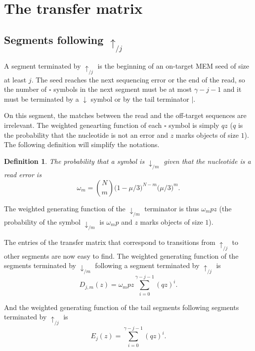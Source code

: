 \documentclass{article}
\newtheorem{definition}{Definition}
\begin{document}
\section{The transfer matrix}
\label{sec:transfer_mat}



\subsection{Segments following $\uparrow_{/j}$}

A segment terminated by $\uparrow_{/j}$ is the beginning of an on-target
MEM seed of size at least $j$. The seed reaches the next sequencing
error or the end of the read, so the number of $\square$ symbols in the
next segment must be at most $\gamma-j-1$ and it must be terminated by a
$\downarrow$ symbol or by the tail terminator $|$.

On this segment, the matches between the read and the off-target sequences
are irrelevant. The weighted genearting function of each $\square$ symbol
is simply $qz$ ($q$ is the probability that the nucleotide is not an error
and $z$ marks objects of size $1$). The following definition will simplify
the notations.

\begin{definition}
The probability that a symbol is $\downarrow_{/m}$ given that the
nucleotide is a read error is
\begin{equation}
\label{eq:omega}
\omega_m = {N \choose m} \big(1 - \mu/3\big)^{N-m} \big(\mu/3\big)^m.
\end{equation}
\end{definition}

The weighted generating function of the $\downarrow_{/m}$ terminator is
thus $\omega_m pz$ (the probability of the symbol $\downarrow_{/m}$ is
$\omega_m p$ and $z$ marks objects of size $1$).

The entries of the transfer matrix that correspond to transitions from
$\uparrow_{/j}$ to other segments are now easy to find. The weighted
generating function of the segments terminated by $\downarrow_{/m}$
following a segment terminated by $\uparrow_{/j}$ is
\begin{equation}
\label{eq:D}
D_{j,m}(z) = \omega_m pz \sum_{i=0}^{\gamma-j-1} (qz)^i.
\end{equation}

And the weighted generating function of the tail segments following
segments terminated by $\uparrow_{/j}$ is
\begin{equation}
\label{eq:E}
E_j(z) = \sum_{i=0}^{\gamma-j-1} (qz)^i.
\end{equation}
\end{document}

